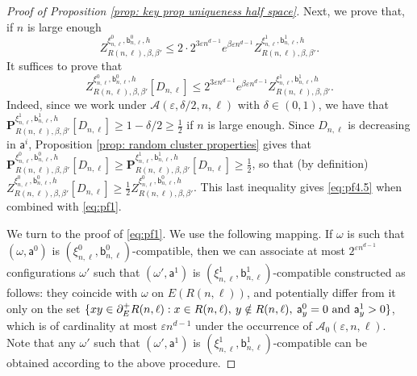 \documentclass[11pt,a4paper]{article}
\numberwithin{equation}{section}
\theoremstyle{plain}
\theoremstyle{definition}
\begin{document}
\begin{proof}[Proof of Proposition \textup{\ref{prop: key prop uniqueness half space}}]
Next, we prove that, if $n$ is large enough
\begin{equation}\label{eq:pf4.5}
    Z^{\xi^0_{n,\ell},\mathsf{b}_{n,\ell}^0,h}_{R(n,\ell),\beta,\beta'}\leq 2\cdot 2^{3\varepsilon n^{d-1}}e^{\beta \varepsilon n^{d-1}}Z^{\xi^1_{n,\ell},\mathsf{b}_{n,\ell}^1,h}_{R(n,\ell),\beta,\beta'}.
\end{equation}
It suffices to prove that
\begin{equation}\label{eq:pf1}
Z^{\xi^0_{n,\ell},\mathsf{b}_{n,\ell}^0,h}_{R(n,\ell),\beta,\beta'}[D_{n,\ell}]\leq 2^{3\varepsilon n^{d-1}}e^{\beta \varepsilon n^{d-1}}Z^{\xi^1_{n,\ell},\mathsf{b}_{n,\ell}^1,h}_{R(n,\ell),\beta,\beta'}.
\end{equation}
Indeed, since we work under $\mathcal{A}(\varepsilon,\delta/2,n,\ell)$ with $\delta\in (0,1)$, we have that $\mathbf P^{\xi^1_{n,\ell},\mathsf{b}_{n,\ell}^1,h}_{R(n,\ell),\beta,\beta'}[D_{n,\ell}]\geq 1-\delta/2\geq \tfrac{1}{2}$ if $n$ is large enough. Since $D_{n,\ell}$ is decreasing in $\mathsf{a}^i$, Proposition \ref{prop: random cluster properties} gives that $\mathbf P^{\xi^0_{n,\ell},\mathsf{b}_{n,\ell}^0,h}_{R(n,\ell),\beta,\beta'}[D_{n,\ell}]\geq \mathbf P^{\xi^1_{n,\ell},\mathsf{b}_{n,\ell}^1,h}_{R(n,\ell),\beta,\beta'}[D_{n,\ell}]\geq \tfrac{1}{2}$, so that (by definition) $Z^{\xi^0_{n,\ell},\mathsf{b}_{n,\ell}^0,h}_{R(n,\ell),\beta,\beta'}[D_{n,\ell}]\geq \tfrac{1}{2}Z^{\xi^0_{n,\ell},\mathsf{b}_{n,\ell}^0,h}_{R(n,\ell),\beta,\beta'}$. This last inequality gives \eqref{eq:pf4.5} when combined with \eqref{eq:pf1}.

We turn to the proof of \eqref{eq:pf1}. We use the following mapping. If $\omega$ is such that $(\omega,\mathsf{a}^0)$ is $(\xi^0_{n,\ell},\mathsf{b}^0_{n,\ell})$-compatible, then we can associate at most $2^{\varepsilon n^{d-1}}$ configurations $\omega'$ such that $(\omega',\mathsf{a}^1)$ is $(\xi^1_{n,\ell},\mathsf{b}^1_{n,\ell})$-compatible constructed as follows: they coincide with $\omega$ on $E(R(n,\ell))$, and potentially differ from it only on the set $\{xy\in \partial^+_E R(n,\ell): x\in R(n,\ell), \: y\notin R(n,\ell), \: \mathsf{a}^0_y=0 \textup{ and }\mathsf{a}^1_y>0\}$, which is of cardinality at most $\varepsilon n^{d-1}$ under the occurrence of $\mathcal{A}_0(\varepsilon,n,\ell)$. Note that any $\omega'$ such that $(\omega',\mathsf{a}^1)$ is $(\xi^1_{n,\ell},\mathsf{b}^1_{n,\ell})$-compatible can be obtained according to the above procedure.


\end{proof}
\end{document}
